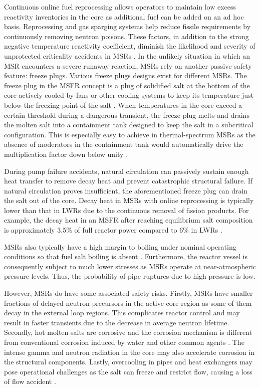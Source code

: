 Continuous online fuel reprocessing allows operators to maintain low excess
reactivity inventories in the core as additional fuel can be added on an ad
hoc basis. Reprocessing and gas sparging systems help reduce fissile
requirements by continuously removing neutron poisons. These factors, in
addition to the strong negative temperature
reactivity coefficient, diminish the likelihood and severity of unprotected
criticality accidents in \glspl{MSR} \cite{elsheikh_safety_2013}. In the
unlikely situation in which an \gls{MSR} encounters a severe runaway reaction,
\glspl{MSR} rely on another passive safety feature: freeze plugs. Various
freeze plugs designs exist for different \glspl{MSR}. The freeze plug
in the \gls{MSFR} concept is a plug of solidified salt at the bottom of the
core actively cooled by fans or other cooling systems to keep its temperature
just below the freezing point of the salt \cite{aji_experimental_2020}. When
temperatures in the core exceed a certain threshold during a
dangerous transient, the freeze plug melts and drains the molten salt
into a containment tank designed to keep the salt in a subcritical
configuration. This is especially easy to achieve in thermal-spectrum
\glspl{MSR} as the absence of moderators in the containment tank would
automatically drive the multiplication factor down below unity
\cite{elsheikh_safety_2013}.

During pump failure accidents, natural circulation can passively sustain
enough heat transfer to remove decay heat and prevent catastrophic structural
failure. If natural circulation proves insufficient, the aforementioned freeze
plug can drain the salt out of the core. Decay heat in \glspl{MSR} with online
reprocessing is typically lower than that in \glspl{LWR} due to the
continuous removal of fission products. For example, the decay heat in an
\gls{MSFR} after reaching equilibrium salt composition is approximately
3.5\% of full reactor power compared to 6\% in \glspl{LWR}
\cite{brovchenko_design-related_2013}.

\glspl{MSR} also typically have a high margin to boiling under nominal
operating conditions so that fuel salt boiling is absent
\cite{elsheikh_safety_2013}. Furthermore, the reactor vessel is consequently
subject to much lower stresses as \glspl{MSR} operate at near-atmospheric
pressure levels. Thus, the probability of pipe ruptures due to high pressure
is low.

However, \glspl{MSR} do have some associated safety risks.
Firstly, \glspl{MSR} have smaller fractions of delayed neutron precursors in
the active core region as some of them decay in the external loop regions.
This complicates reactor control and may result in faster transients due to
the decrease in average neutron lifetime. Secondly, hot molten salts are
corrosive and the corrosion mechanism is different from conventional
corrosion induced by water and other common agents \cite{yoshioka_7_2017}. The
intense gamma and neutron radiation in the core may also accelerate corrosion
in the structural components. Lastly, overcooling in pipes and heat exchangers
may pose operational challenges as the salt can freeze and restrict flow,
causing a loss of flow accident \cite{ho_molten_2013}.

